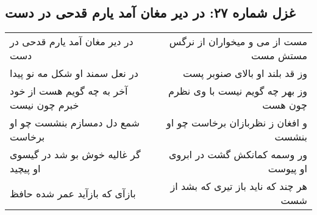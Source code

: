 \begin{center}
\section*{غزل شماره ۲۷: در دیر مغان آمد یارم قدحی در دست}
\label{sec:sh027}
\begin{longtable}{l p{0.5cm} r}
در دیر مغان آمد یارم قدحی در دست
&&
مست از می و میخواران از نرگس مستش مست
\\
در نعل سمند او شکل مه نو پیدا
&&
وز قد بلند او بالای صنوبر پست
\\
آخر به چه گویم هست از خود خبرم چون نیست
&&
وز بهر چه گویم نیست با وی نظرم چون هست
\\
شمع دل دمسازم بنشست چو او برخاست
&&
و افغان ز نظربازان برخاست چو او بنشست
\\
گر غالیه خوش بو شد در گیسوی او پیچید
&&
ور وسمه کمانکش گشت در ابروی او پیوست
\\
بازآی که بازآید عمر شده حافظ
&&
هر چند که ناید باز تیری که بشد از شست
\\
\end{longtable}
\end{center}
